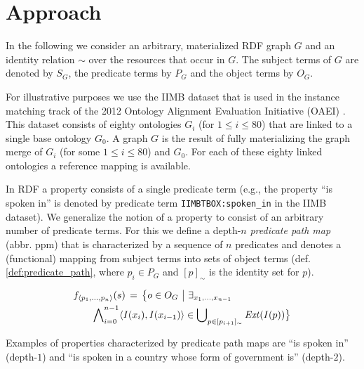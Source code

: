 \section{Approach}
\label{sec:approach}

In the following we consider an arbitrary,
  materialized RDF graph $G$ and an identity relation $\sim$ over
  the resources that occur in $G$.
The subject terms of $G$ are denoted by $S_G$, the predicate terms by $P_G$
  and the object terms by $O_G$.

For illustrative purposes we use the IIMB dataset that is used in the
  instance matching track of the 2012 Ontology Alignment Evaluation
  Initiative (OAEI) \cite{oaei_2012}.
This dataset consists of eighty ontologies $G_i$ (for $1 \leq i \leq 80$)
  that are linked to a single base ontology $G_0$.
A graph $G$ is the result of fully materializing the graph merge
  of $G_i$ (for some $1 \leq i \leq 80$) and $G_0$.
For each of these eighty linked ontologies a reference mapping is available.

In RDF a property consists of a single predicate term
  (e.g., the property ``is spoken in'' is denoted by predicate term
   \verb|IIMBTBOX:spoken_in| in the IIMB dataset).
We generalize the notion of a property to consist of
  an arbitrary number of predicate terms.
For this we define a depth-$n$ \emph{predicate path map} (abbr. ppm)
  that is characterized by a sequence of $n$ predicates
  and denotes a (functional) mapping from subject terms
  into sets of object terms
  (def. \ref{def:predicate_path},
   where $p_i \in P_G$ and $[p]_{\sim}$ is the identity set for $p$).

\small
\begin{definition}
\begin{align}
\label{def:predicate_path}
  f_{\langle p_1,\ldots,p_n\rangle}(s)
\,=\,
  \big\{o \in O_G\,\,\big\vert\,\,
    \exists_{x_1,\ldots,x_{n-1}} \quad \quad \quad \quad \quad \quad\\
      \bigwedge_{i=0}^{n-1}\nolimits
          \langle I(x_i),I(x_{i-1})\rangle
        \in
          \bigcup_{p \in [p_{i+1}]_{\sim}}\nolimits \mathit{Ext}(I(p))
  \big\}\nonumber
\end{align}
\end{definition}
\normalsize

\noindent Examples of properties characterized by predicate path maps are
  ``is spoken in'' (depth-$1$) and
  ``is spoken in a country whose form of government is'' (depth-$2$).
